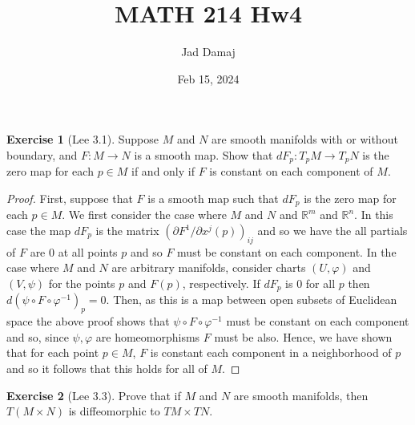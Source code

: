 \documentclass{article}
\title{MATH 214 Hw4}
\author{Jad Damaj}
\date{Feb 15, 2024}
\newcommand{\bR}{\mathbb{R}}
\newcommand{\vp}{\varphi}
\theoremstyle{definition}
\newtheorem{exercise}{Exercise}
\begin{document}
\maketitle

\begin{exercise}[Lee 3.1]
    Suppose $M$ and $N$ are smooth manifolds with or without boundary, and $F: M \to N$ is a smooth map. Show that $dF_p: T_p M \to T_p N$ is the zero map for each $p \in M$ if and only if $F$ is constant on each component of $M$. 
\end{exercise}

\begin{proof}
    First, suppose that $F$ is a smooth map such that $dF_p$ is the zero map for each $p \in M$. We first consider the case where $M$ and $N$ and $\bR^m$ and $\bR^n$. In this case the map $dF_p$ is the matrix $( \partial F^1/ \partial x^j(p))_{ij}$ and so we have the all partials of $F$ are 0 at all points $p$ and so $F$ must be constant on each component. In the case where $M$ and $N$ are arbitrary manifolds, consider charts $(U, \vp)$ and $(V, \psi)$ for the points $p$ and $F(p)$, respectively. If $dF_p$ is 0 for all $p$ then $d(\psi \circ F\circ \vp^{-1})_p = 0$. Then, as this is a map between open subsets of Euclidean space the above proof shows that $\psi \circ F \circ \vp^{-1}$ must be constant on each component and so, since $\psi, \vp$ are homeomorphisms $F$ must be also. Hence, we have shown that for each point $p \in M$, $F$ is constant each component in a neighborhood of $p$ and so it follows that this holds for all of $M$. 
\end{proof}

\begin{exercise}[Lee 3.3]
    Prove that if $M$ and $N$ are smooth manifolds, then $T(M \times N)$ is diffeomorphic to $TM \times TN$. 
\end{exercise}
\end{document}
